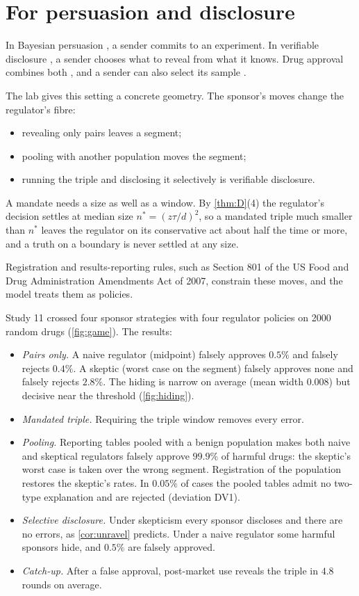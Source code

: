 \documentclass[11pt]{article}
\theoremstyle{definition}\newtheorem{definition}{Definition}\newtheorem{remark}{Remark}
\begin{document}
\section{For persuasion and disclosure}\label{sec:game}
In Bayesian persuasion \cite{KamenicaGentzkow2011}, a sender commits to an experiment. In verifiable disclosure
\cite{Milgrom1981,Grossman1981}, a sender chooses what to reveal from what it knows. Drug approval combines both
\cite{HenryOttaviani2019}, and a sender can also select its sample \cite{DiTillioOttavianiSorensen2021}.

The lab gives this setting a concrete geometry. The sponsor's moves change the regulator's fibre:
\begin{itemize}
\item revealing only pairs leaves a segment;
\item pooling with another population moves the segment;
\item running the triple and disclosing it selectively is verifiable disclosure.
\end{itemize}
A mandate needs a size as well as a window. By \cref{thm:D}(4) the regulator's decision settles at median size $n^*=(z\tau/d)^2$, so
a mandated triple much smaller than $n^*$ leaves the regulator on its conservative act about half the time or more, and a truth on a
boundary is never settled at any size.

Registration and results-reporting rules, such as Section 801 of the US Food and Drug Administration Amendments Act of 2007, constrain
these moves, and the model treats them as policies.

Study 11 crossed four sponsor strategies with four regulator policies on 2000 random drugs (\cref{fig:game}). The results:
\begin{itemize}
\item \emph{Pairs only.} A naive regulator (midpoint) falsely approves $0.5\%$ and falsely rejects $0.4\%$. A skeptic (worst case on
  the segment) falsely approves none and falsely rejects $2.8\%$. The hiding is narrow on average (mean width $0.008$) but decisive near
  the threshold (\cref{fig:hiding}).
\item \emph{Mandated triple.} Requiring the triple window removes every error.
\item \emph{Pooling.} Reporting tables pooled with a benign population makes both naive and skeptical regulators falsely approve
  $99.9\%$ of harmful drugs: the skeptic's worst case is taken over the wrong segment. Registration of the population restores the
  skeptic's rates. In $0.05\%$ of cases the pooled tables admit no two-type explanation and are rejected (deviation DV1).
\item \emph{Selective disclosure.} Under skepticism every sponsor discloses and there are no errors, as \cref{cor:unravel} predicts.
  Under a naive regulator some harmful sponsors hide, and $0.5\%$ are falsely approved.
\item \emph{Catch-up.} After a false approval, post-market use reveals the triple in $4.8$ rounds on average.
\end{itemize}
\end{document}

